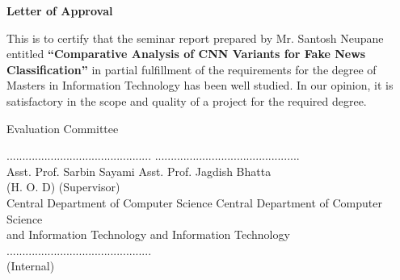 \begin{titlepage}
    \centerline{\large\textbf{Letter of Approval}}
    
    \vspace{1cm}
    
    This is to certify that the seminar report prepared by Mr. Santosh Neupane entitled \textbf{“Comparative Analysis of CNN Variants for Fake News Classification”} in partial fulfillment of the requirements for the 
    degree of Masters in Information Technology has been well 
    studied. In our opinion, it is satisfactory in the scope and quality of a project for the required 
    degree.
    
    \vspace{1.5cm}
    
    \centerline{Evaluation Committee}
    
    \vspace{2cm}
    
    \noindent
    
    \begin{center} 
        .............................................. \hspace{3.5cm} ..............................................\\
        Asst. Prof. Sarbin Sayami \hspace{4cm} Asst. Prof. Jagdish Bhatta \\
        (H. O. D)  \hspace{7cm}(Supervisor)\\
        Central Department of Computer Science \hfill
        Central Department of Computer Science \\
        and Information Technology \hspace{3.5cm} and Information Technology\\
        
        \vspace{4cm}
        ..............................................\\
        (Internal)   
        
    \end{center}
\end{titlepage}